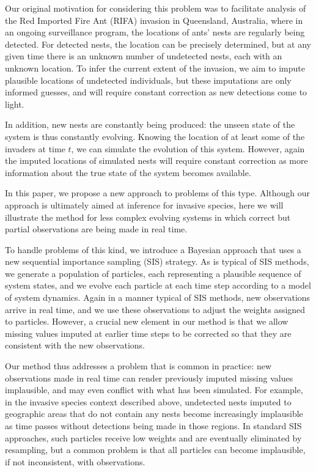 Our original motivation for considering this problem was to facilitate analysis of the Red Imported Fire Ant (RIFA) invasion in Queensland, Australia, where in an ongoing surveillance program, the locations of ants’ nests are regularly being detected. For detected nests, the location can be precisely determined, but at any given time there is an unknown number of undetected nests, each with an unknown location. To infer the current extent of the invasion, we aim to impute plausible locations of undetected individuals, but these imputations are only informed guesses, and will require constant correction as new detections come to light.

In addition, new nests are constantly being produced: the unseen state of the system is thus constantly evolving. Knowing the location of at least some of the invaders at time $t$, we can simulate the evolution of this system. However, again the imputed locations of simulated nests will require constant correction as more information about the true state of the system becomes available.

In this paper, we propose a new approach to problems of this type. Although our approach is ultimately aimed at inference for invasive species, here we will illustrate the method for less complex evolving systems in which correct but partial observations are being made in real time.

To handle problems of this kind, we introduce a Bayesian approach that uses a new sequential importance sampling (SIS) strategy. As is typical of SIS methods, we generate a population of particles, each representing a plausible sequence of system states, and we evolve each particle at each time step according to a model of system dynamics. Again in a manner typical of SIS methods, new observations arrive in real time, and we use these observations to adjust the weights assigned to particles. However, a crucial new element in our method is that we allow missing values imputed at earlier time steps to be corrected so that they are consistent with the new observations.

Our method thus addresses a problem that is common in practice: new observations made in real time can render previously imputed missing values implausible, and may even conflict with what has been simulated. For example, in the invasive species context described above, undetected nests imputed to geographic areas that do not contain any nests become increasingly implausible as time passes without detections being made in those regions. In standard SIS approaches, such particles receive low weights and are eventually eliminated by resampling, but a common problem is that all particles can become implausible, if not inconsistent, with observations.

